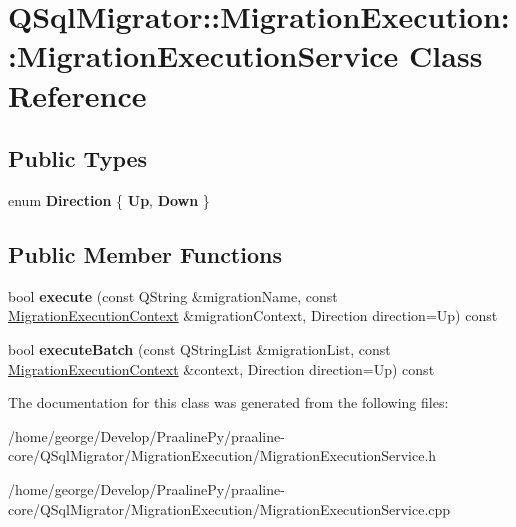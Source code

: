 \hypertarget{class_q_sql_migrator_1_1_migration_execution_1_1_migration_execution_service}{}\section{Q\+Sql\+Migrator\+:\+:Migration\+Execution\+:\+:Migration\+Execution\+Service Class Reference}
\label{class_q_sql_migrator_1_1_migration_execution_1_1_migration_execution_service}
\subsection*{Public Types}
\begin{DoxyCompactItemize}
\item 
\mbox{\label{class_q_sql_migrator_1_1_migration_execution_1_1_migration_execution_service_aa245cd5d69f37ff348e9736b1856a15d}} 
enum {\bfseries Direction} \{ {\bfseries Up}, 
{\bfseries Down}
 \}
\end{DoxyCompactItemize}
\subsection*{Public Member Functions}
\begin{DoxyCompactItemize}
\item 
\mbox{\label{class_q_sql_migrator_1_1_migration_execution_1_1_migration_execution_service_a42eb35dbfa3e962d01d2eea93d7e7cc5}} 
bool {\bfseries execute} (const Q\+String \&migration\+Name, const \hyperlink{class_q_sql_migrator_1_1_migration_execution_1_1_migration_execution_context}{Migration\+Execution\+Context} \&migration\+Context, Direction direction=Up) const
\item 
\mbox{\label{class_q_sql_migrator_1_1_migration_execution_1_1_migration_execution_service_ae685dae990c45e59784ce8f390f8b99a}} 
bool {\bfseries execute\+Batch} (const Q\+String\+List \&migration\+List, const \hyperlink{class_q_sql_migrator_1_1_migration_execution_1_1_migration_execution_context}{Migration\+Execution\+Context} \&context, Direction direction=Up) const
\end{DoxyCompactItemize}


The documentation for this class was generated from the following files\+:\begin{DoxyCompactItemize}
\item 
/home/george/\+Develop/\+Praaline\+Py/praaline-\/core/\+Q\+Sql\+Migrator/\+Migration\+Execution/Migration\+Execution\+Service.\+h\item 
/home/george/\+Develop/\+Praaline\+Py/praaline-\/core/\+Q\+Sql\+Migrator/\+Migration\+Execution/Migration\+Execution\+Service.\+cpp\end{DoxyCompactItemize}
